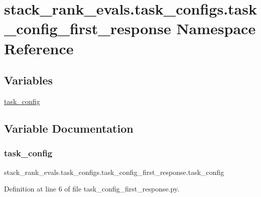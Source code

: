 \hypertarget{namespacestack__rank__evals_1_1task__configs_1_1task__config__first__response}{}\section{stack\+\_\+rank\+\_\+evals.\+task\+\_\+configs.\+task\+\_\+config\+\_\+first\+\_\+response Namespace Reference}
\label{namespacestack__rank__evals_1_1task__configs_1_1task__config__first__response}
\subsection*{Variables}
\begin{DoxyCompactItemize}
\item 
\hyperlink{namespacestack__rank__evals_1_1task__configs_1_1task__config__first__response_a2d4ec8eb29d9b55c1e211687b5f36d71}{task\+\_\+config}
\end{DoxyCompactItemize}


\subsection{Variable Documentation}
\mbox{\label{namespacestack__rank__evals_1_1task__configs_1_1task__config__first__response_a2d4ec8eb29d9b55c1e211687b5f36d71}} 
\subsubsection{\texorpdfstring{task\+\_\+config}{task\_config}}
{\footnotesize\ttfamily stack\+\_\+rank\+\_\+evals.\+task\+\_\+configs.\+task\+\_\+config\+\_\+first\+\_\+response.\+task\+\_\+config}



Definition at line 6 of file task\+\_\+config\+\_\+first\+\_\+response.\+py.

